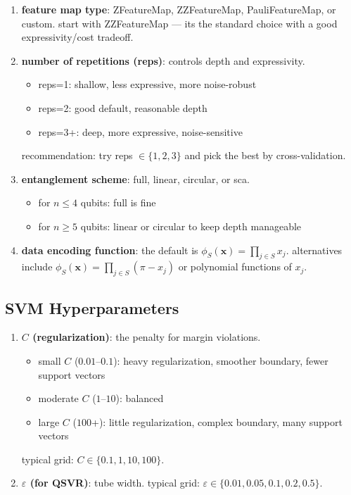 \documentclass[11pt,a4paper]{article}
\theoremstyle{definition}
\theoremstyle{remark}
\begin{document}
\begin{enumerate}[leftmargin=*]
    \item \textbf{feature map type}: ZFeatureMap, ZZFeatureMap, PauliFeatureMap, or custom. start with ZZFeatureMap --- its the standard choice with a good expressivity/cost tradeoff.

    \item \textbf{number of repetitions (reps)}: controls depth and expressivity.
    \begin{itemize}[leftmargin=*]
        \item reps=1: shallow, less expressive, more noise-robust
        \item reps=2: good default, reasonable depth
        \item reps=3+: deep, more expressive, noise-sensitive
    \end{itemize}
    recommendation: try reps $\in \{1, 2, 3\}$ and pick the best by cross-validation.

    \item \textbf{entanglement scheme}: full, linear, circular, or sca.
    \begin{itemize}[leftmargin=*]
        \item for $n \leq 4$ qubits: full is fine
        \item for $n \geq 5$ qubits: linear or circular to keep depth manageable
    \end{itemize}

    \item \textbf{data encoding function}: the default is $\phi_S(\mathbf{x}) = \prod_{j \in S} x_j$. alternatives include $\phi_S(\mathbf{x}) = \prod_{j \in S} (\pi - x_j)$ or polynomial functions of $x_j$.
\end{enumerate}

\subsection{SVM Hyperparameters}

\begin{enumerate}[leftmargin=*]
    \item \textbf{$C$ (regularization)}: the penalty for margin violations.
    \begin{itemize}[leftmargin=*]
        \item small $C$ ($0.01$--$0.1$): heavy regularization, smoother boundary, fewer support vectors
        \item moderate $C$ ($1$--$10$): balanced
        \item large $C$ ($100$+): little regularization, complex boundary, many support vectors
    \end{itemize}
    typical grid: $C \in \{0.1, 1, 10, 100\}$.

    \item \textbf{$\varepsilon$ (for QSVR)}: tube width.
    typical grid: $\varepsilon \in \{0.01, 0.05, 0.1, 0.2, 0.5\}$.
\end{enumerate}
\end{document}
